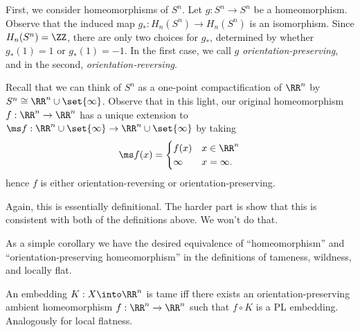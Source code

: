 \begin{sproof}[Sketches]
\begin{itemize}
      First, we consider homeomorphisms of $S^n$. Let $g : S^n \to
      S^n$ be a homeomorphism. Observe that the induced map $g_* :
      H_n(S^n) \to H_n(S^n)$ is an isomorphism. Since $H_n(S^n) =
      \ZZ$, there are only two choices for $g_*$, determined by
      whether $g_*(1) = 1$ or $g_*(1) = -1$. In the first case, we
      call $g$ \emph{orientation-preserving}, and in the second,
      \emph{orientation-reversing}.

      Recall that we can think of $S^n$ as a one-point
      compactification of $\RR^n$ by $S^n \cong \RR^n \cup
      \set{\infty}$. Observe that in this light, our original
      homeomorphism $f : \RR^n \to \RR^n$ has a unique extension to
      $\ms f : \RR^n \cup \set{\infty} \to \RR^n \cup \set{\infty}$ by
      taking
      \[
      \ms f(x) =
      \begin{cases}
        f(x) & x \in \RR^n \\
        \infty & x = \infty.
      \end{cases}
      \]
      hence $f$ is either orientation-reversing or
      orientation-preserving.

      Again, this is essentially definitional. The harder part is show
      that this is consistent with both of the definitions above. We
      won't do that.\renewcommand{\qed}{\hfill $\square$}\qedhere
  \end{itemize}
\end{sproof}
As a simple corollary we have the desired equivalence of
``homeomorphism'' and ``orientation-preserving homeomorphism'' in the
definitions of tameness, wildness, and locally flat.
\begin{corollary}
  An embedding $K : X \into \RR^n$ is tame iff there exists an
  orientation-preserving ambient homeomorphism $f : \RR^n \to \RR^n$
  such that $f \circ K$ is a PL embedding. Analogously for local
  flatness.
\end{corollary}
